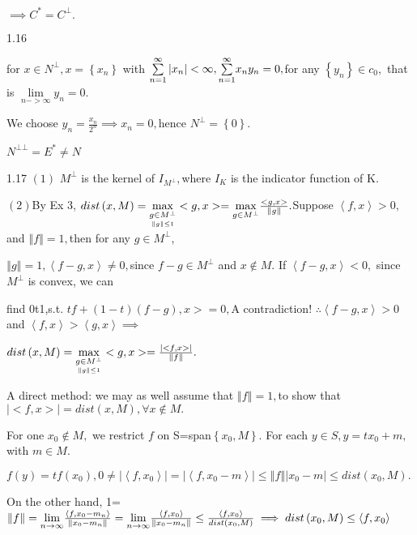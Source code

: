 \documentclass{article}
\begin{document}
$\implies C^{\ast }=C^{\bot }.$

1.16

\bigskip for $x\in N^{\bot },x=\left\{ x_{n}\right\} $ with $\underset{n=1}{%
\overset{\infty }{\sum }}\left\vert x_{n}\right\vert <\infty ,\underset{n=1}{%
\overset{\infty }{\sum }}x_{n}y_{n}=0,$for any $\left\{ y_{n}\right\} \in
c_{0},$ that is $\underset{n->\infty }{\lim }y_{n}=0.$

We choose $y_{n}=\frac{x_{n}}{2^{n}}\implies x_{n}=0,$hence $N^{\bot
}=\left\{ 0\right\} .$

$N^{\bot \bot }=E^{\ast }\neq N$

1.17 $\left( 1\right) $ $M^{\bot }$ is the kernel of $I_{M^{\bot }},$where $%
I_{K}$ is the indicator function of K.

$\left( 2\right) $By Ex 3, $dist\left( x,M\right) =\underset{\underset{%
\left\Vert g\right\Vert \leq 1}{g\in M^{\bot }}}{\max }<g,x>=\underset{g\in
M^{\bot }}{\max }\frac{<g,x>}{\left\Vert g\right\Vert }.$Suppose $%
\left\langle f,x\right\rangle >0,$and $\left\Vert f\right\Vert =1,$then for
any $g\in M^{\bot }$\bigskip ,

$\left\Vert g\right\Vert =1,\left\langle f-g,x\right\rangle \neq 0,$since $%
f-g\in M^{\bot }$ and $x\notin M.$ If $\left\langle f-g,x\right\rangle <0,$%
since $M^{\bot }$ is convex, we can

find 0\TEXTsymbol{<}t\TEXTsymbol{<}1,s.t. \TEXTsymbol{<}$tf+\left(
1-t\right) \left( f-g\right) ,x>=0,$A contradiction! $\therefore
\left\langle f-g,x\right\rangle >0$ and $\left\langle f,x\right\rangle
>\left\langle g,x\right\rangle \implies $

$dist\left( x,M\right) =\underset{\underset{\left\Vert g\right\Vert \leq 1}{%
g\in M^{\bot }}}{\max }<g,x>=\frac{\left\vert <f,x>\right\vert }{\left\Vert
f\right\Vert }.$

A direct method: we may as well assume that $\left\Vert f\right\Vert =1,$to
show that $\left\vert <f,x>\right\vert =dist\left( x,M\right) ,\forall
x\notin M.$

For one $x_{0}\notin M,$ we restrict $f$ on S=span$\left\{ x_{0},M\right\} .$%
For each $y\in S,y=tx_{0}+m,$with $m\in M.$

$f\left( y\right) =tf\left( x_{0}\right) ,0\neq \left\vert \left\langle
f,x_{0}\right\rangle \right\vert =\left\vert \left\langle
f,x_{0}-m\right\rangle \right\vert \leq \left\Vert f\right\Vert \left\vert
x_{0}-m\right\vert \leq dist\left( x_{0},M\right) .$

On the other hand, 1=$\left\Vert f\right\Vert =\underset{n\rightarrow \infty 
}{\lim }\frac{\left\langle f,x_{0}-m_{n}\right\rangle }{\left\Vert
x_{0}-m_{n}\right\Vert }=\underset{n\rightarrow \infty }{\lim }\frac{%
\left\langle f,x_{0}\right\rangle }{\left\Vert x_{0}-m_{n}\right\Vert }\leq 
\frac{\left\langle f,x_{0}\right\rangle }{dist\left( x_{0},M\right) }%
\implies dist\left( x_{0},M\right) \leq \left\langle f,x_{0}\right\rangle $
\end{document}
